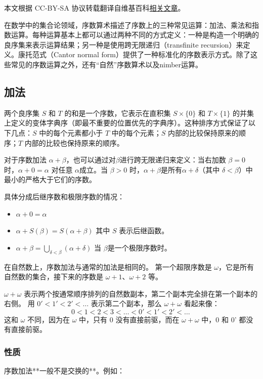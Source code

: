 
本文根据 CC-BY-SA 协议转载翻译自维基百科\href{https://en.wikipedia.org/wiki/Ordinal_arithmetic}{相关文章}。

在数学中的集合论领域，序数算术描述了序数上的三种常见运算：加法、乘法和指数运算。每种运算基本上都可以通过两种不同的方式定义：一种是构造一个明确的良序集来表示运算结果；另一种是使用跨无限递归（transfinite recursion）来定义。康托范式（Cantor normal form）提供了一种标准化的序数表示方式。除了这些常见的序数运算之外，还有“自然”序数算术以及nimber运算。
\subsection{加法}  
两个良序集 \(S\) 和 \(T\) 的和是一个序数，它表示在直积集 \(S \times \{0\}\) 和 \(T \times \{1\}\) 的并集上定义的变体字典序（即最不重要的位置优先的字典序）。这种排序方式保证了以下几点：\(S\) 中的每个元素都小于 \(T\) 中的每个元素；\(S\) 内部的比较保持原来的顺序；\(T\) 内部的比较也保持原来的顺序。 

对于序数加法 \(\alpha + \beta\)，也可以通过对\(\beta\)进行跨无限递归来定义：当右加数 \(\beta = 0\) 时，\(\alpha + 0 = \alpha\) 对任意 \(\alpha\)成立。当 \(\beta > 0\) 时，\(\alpha + \beta\)是所有\(\alpha + \delta\)（其中 \(\delta < \beta\)）中最小的严格大于它们的序数。  

具体分成后继序数和极限序数的情况：
\begin{itemize}
\item \(\alpha + 0 = \alpha\)~
\item \(\alpha + S(\beta) = S(\alpha + \beta)\) 其中 \(S\) 表示后继函数。
\item \(\alpha + \beta = \bigcup_{\delta < \beta} (\alpha + \delta)\) 当 \(\beta\)是一个极限序数时。
\end{itemize}
在自然数上，序数加法与通常的加法是相同的。  
第一个超限序数是 \(\omega\)，它是所有自然数的集合，接下来的序数是 \(\omega + 1\)、\(\omega + 2\) 等。  

\(\omega + \omega\) 表示两个按通常顺序排列的自然数副本，第二个副本完全排在第一个副本的右侧。  
用 \(0' < 1' < 2' < \dots\) 表示第二个副本，那么 \(\omega + \omega\) 看起来像：
\[
0 < 1 < 2 < 3 < \dots < 0' < 1' < 2' < \dots~
\]
这和 \(\omega\) 不同，因为在 \(\omega\) 中，只有 0 没有直接前驱，而在 \(\omega + \omega\) 中，0 和 0' 都没有直接前驱。
\subsubsection{性质}  
序数加法**一般不是交换的**。例如：

